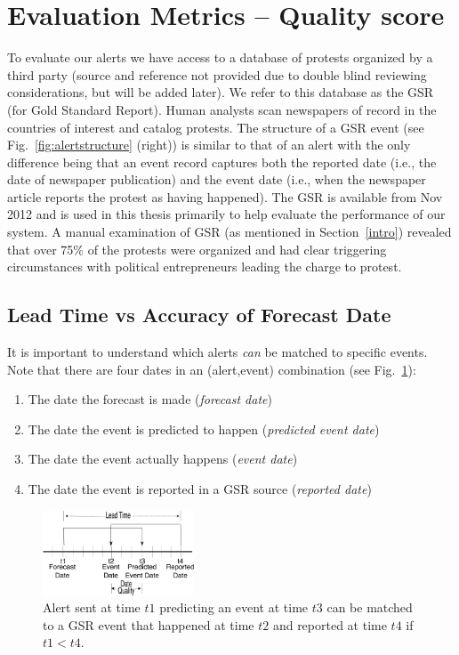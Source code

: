 \section{Evaluation Metrics -- Quality score}
To evaluate our alerts we have access to a database of protests organized by a third party (source and reference
not provided due to double blind reviewing considerations, but will be added later). We refer to this database as the
GSR (for Gold Standard Report). Human analysts scan newspapers of record in the countries of interest and catalog
protests. The structure of a GSR event (see Fig.~\ref{fig:alertstructure} (right)) is similar to that of an alert with
the only difference being that an event record captures both the reported date (i.e., the date of newspaper publication)
and the event date (i.e., when the newspaper article reports the protest as having happened).
The GSR is available from Nov 2012 
and is used in this thesis primarily to 
help evaluate the performance of our system. A manual examination of GSR (as mentioned in Section~\ref{intro}) revealed
that over 75\% of the protests were organized and had clear triggering circumstances with political entrepreneurs leading the
charge to protest.

\subsection{Lead Time vs Accuracy of Forecast Date}
It is important to understand which alerts {\it can} be matched to specific events.
Note that there are four dates in an (alert,event) combination (see Fig.~\ref{fig:timeline}):
\begin{enumerate}
\item The date the forecast is made ({\it forecast date})
\item The date the event is predicted to happen ({\it predicted event date})
\item The date the event actually happens ({\it event date})
\item The date the event is reported in a GSR source ({\it reported date})
\end{enumerate}

\begin{figure}[t]
\centering
\includegraphics[width=0.40\textwidth]{figures/timeline}
\caption[Timeline depicting lead-time vs date accuracy]{Alert sent at time $t1$ predicting an event at time $t3$
can be matched to a GSR event that happened at time $t2$ and reported
at time $t4$ if $t1 < t4$.}
\label{fig:timeline}
\end{figure}

